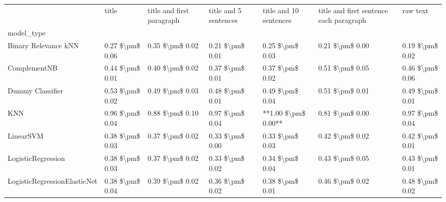 \begin{tabular}{lllllll}
\toprule
{} &            title & title and first paragraph & title and 5 sentences & title and 10 sentences & title and first sentence each paragraph &         raw text \\
model\_type                      &                  &                           &                       &                        &                                         &                  \\
\midrule
Binary Relevance kNN            &  0.27 \$\textbackslash pm\$ 0.06 &           0.35 \$\textbackslash pm\$ 0.02 &       0.21 \$\textbackslash pm\$ 0.01 &        0.25 \$\textbackslash pm\$ 0.03 &                         0.21 \$\textbackslash pm\$ 0.00 &  0.19 \$\textbackslash pm\$ 0.02 \\
ComplementNB                    &  0.44 \$\textbackslash pm\$ 0.01 &           0.40 \$\textbackslash pm\$ 0.02 &       0.37 \$\textbackslash pm\$ 0.01 &        0.37 \$\textbackslash pm\$ 0.02 &                         0.51 \$\textbackslash pm\$ 0.05 &  0.46 \$\textbackslash pm\$ 0.06 \\
Dummy Classifier                &  0.53 \$\textbackslash pm\$ 0.02 &           0.49 \$\textbackslash pm\$ 0.03 &       0.48 \$\textbackslash pm\$ 0.01 &        0.49 \$\textbackslash pm\$ 0.04 &                         0.51 \$\textbackslash pm\$ 0.01 &  0.49 \$\textbackslash pm\$ 0.01 \\
KNN                             &  0.96 \$\textbackslash pm\$ 0.04 &           0.88 \$\textbackslash pm\$ 0.10 &       0.97 \$\textbackslash pm\$ 0.04 &    **1.00 \$\textbackslash pm\$ 0.00** &                         0.81 \$\textbackslash pm\$ 0.00 &  0.97 \$\textbackslash pm\$ 0.04 \\
LinearSVM                       &  0.38 \$\textbackslash pm\$ 0.03 &           0.37 \$\textbackslash pm\$ 0.02 &       0.33 \$\textbackslash pm\$ 0.00 &        0.33 \$\textbackslash pm\$ 0.03 &                         0.42 \$\textbackslash pm\$ 0.02 &  0.42 \$\textbackslash pm\$ 0.01 \\
LogisticRegression              &  0.38 \$\textbackslash pm\$ 0.03 &           0.37 \$\textbackslash pm\$ 0.02 &       0.33 \$\textbackslash pm\$ 0.02 &        0.34 \$\textbackslash pm\$ 0.04 &                         0.43 \$\textbackslash pm\$ 0.05 &  0.43 \$\textbackslash pm\$ 0.01 \\
LogisticRegressionElasticNet    &  0.38 \$\textbackslash pm\$ 0.04 &           0.39 \$\textbackslash pm\$ 0.02 &       0.36 \$\textbackslash pm\$ 0.02 &        0.38 \$\textbackslash pm\$ 0.01 &                         0.46 \$\textbackslash pm\$ 0.02 &  0.48 \$\textbackslash pm\$ 0.02 \\

\end{tabular}
